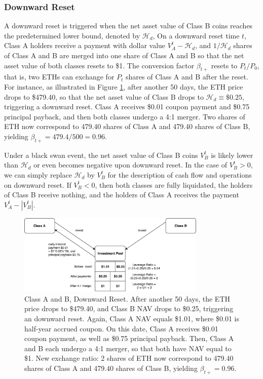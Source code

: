 \documentclass[draft, noinfoline]{ectaart}
\numberwithin{equation}{section}
\theoremstyle{plain}
\begin{document}
\subsubsection{Downward Reset}
 A downward reset is triggered when the net asset value of Class B coins reaches the predetermined lower bound, denoted by $\mathcal{H}_{d}$,  On a downward reset time $t$, Class A holders receive a payment with dollar value $V_{A}^{t}-\mathcal{H}_{d}$, and  $1/\mathcal{H}_{d}$ shares of Class A and B are merged into one share of Class A and B so that the net asset value of both classes resets to \$1. The conversion factor $\beta_{t+}$ resets to $P_t/P_0$, that is, two ETHs can exchange for $P_t$ shares of Class A and B after the reset. For instance, as illustrated in Figure \ref{fig:downward}, after another 50 days, the ETH price drops to \$479.40, so that the net asset value of Class B drops to $\mathcal{H}_{d}\equiv \$0.25$, triggering a downward reset. Class A receives \$0.01 coupon payment and \$0.75 principal payback, and then both classes undergo a 4:1 merger. Two shares of ETH now correspond to 479.40 shares of Class A and 479.40 shares of Class B, yielding $\beta_{t+}=479.4/500=0.96$.
 
 Under a black swan event, the net asset value of Class B coins $V_B^t$ is likely lower than $\mathcal{H}_{d}$ or even becomes negative upon downward reset. In the case of $V_B^t>0$, we can simply replace $\mathcal{H}_{d}$ by $V_B^t$ for the description of cash flow and operations on downward reset. If $V_B^t<0$, then both classes are fully liquidated, the holders of Class B receive nothing, and the holders of Class A receives the payment $V_A^t-|V_{B}^{t}|$. 

\begin{figure}[!htb]
	\centering
	\includegraphics[width=0.8\textwidth]{downward}
	\caption{Class A and B, Downward Reset. After another 50 days, the ETH price drops to \$479.40, and Class B NAV drops to \$0.25, triggering an downward reset. Again, Class A NAV equals \$1.01, where \$0.01 is half-year accrued coupon. On this date, Class A receives \$0.01 coupon payment, as well as \$0.75 principal payback. Then, Class A and B each undergo a 4:1 merger, so that both have NAV equal to \$1. New exchange ratio: 2 shares of ETH now correspond to 479.40 shares of Class A and 479.40 shares of Class B, yielding $\beta_{t+}=0.96$.}\label{fig:downward}
\end{figure}
\end{document}
